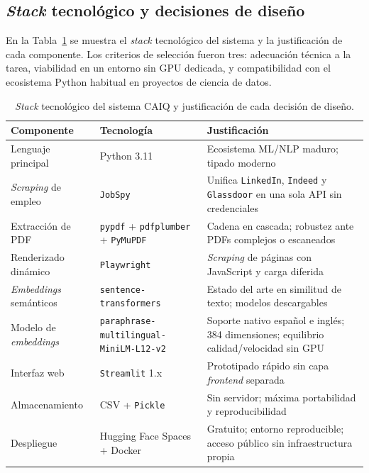 \subsection{\textit{Stack} tecnológico y decisiones de diseño}
\label{subsec:stack_tecnologico}
En la Tabla~\ref{tab:stack} se muestra el \textit{stack} tecnológico del sistema y la justificación de cada componente. Los criterios de selección fueron tres: adecuación técnica a la tarea, viabilidad en un entorno sin GPU dedicada, y compatibilidad con el ecosistema Python habitual en proyectos de ciencia de datos.

\begin{table}[H]
  \caption{\textit{Stack} tecnológico del sistema CAIQ y justificación de cada decisión de diseño.}
  \label{tab:stack}
  \centering
  \footnotesize
  \begin{tabular}{|p{3.8cm}|p{4.5cm}|p{6.2cm}|}
    \hline
    \rowcolor{gray!15}
    \textbf{Componente} & \textbf{Tecnología} & \textbf{Justificación} \\
    \hline
    Lenguaje principal    & Python 3.11                          & Ecosistema ML/NLP maduro; tipado moderno \\
    \hline
    \textit{Scraping} de empleo    & \texttt{JobSpy}                               & Unifica \texttt{LinkedIn}, \texttt{Indeed} y \texttt{Glassdoor} en una sola API sin credenciales \\
    \hline
    Extracción de PDF     & \texttt{pypdf} + \texttt{pdfplumber} + \texttt{PyMuPDF}         & Cadena en cascada; robustez ante PDFs complejos o escaneados \\
    \hline
    Renderizado dinámico  & \texttt{Playwright}                           & \textit{Scraping} de páginas con JavaScript y carga diferida \\
    \hline
    \textit{Embeddings} semánticos & \texttt{sentence-transformers}                & Estado del arte en similitud de texto; modelos descargables \\
    \hline
    Modelo de \textit{embeddings}  & \texttt{paraphrase-multilingual-} \newline \texttt{MiniLM-L12-v2} & Soporte nativo español e inglés; 384 dimensiones; equilibrio calidad/velocidad sin GPU \\
    \hline
    Interfaz web          & \texttt{Streamlit} 1.x                        & Prototipado rápido sin capa \textit{frontend} separada \\
    \hline
    Almacenamiento        & CSV + \texttt{Pickle}                         & Sin servidor; máxima portabilidad y reproducibilidad \\
    \hline
    Despliegue            & Hugging Face Spaces + Docker         & Gratuito; entorno reproducible; acceso público sin infraestructura propia \\
    \hline
  \end{tabular}
\end{table}

